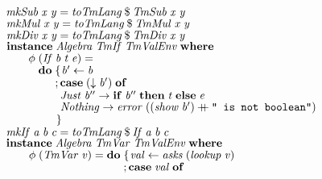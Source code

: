 \documentclass[10pt]{article}
\newcommand{\Conid}[1]{\mathit{#1}}
\newcommand{\Varid}[1]{\mathit{#1}}
\newcommand{\plus}{\mathbin{+\!\!\!+}}
\begin{document}
\begin{tabbing}
${\hskip1.00em\relax\Varid{mkSub}\;\Varid{x}\;\Varid{y}\mathrel{=}\Varid{toTmLang}\mathbin{\$}\Conid{TmSub}\;\Varid{x}\;\Varid{y}}$\\
${\hskip1.00em\relax\Varid{mkMul}\;\Varid{x}\;\Varid{y}\mathrel{=}\Varid{toTmLang}\mathbin{\$}\Conid{TmMul}\;\Varid{x}\;\Varid{y}}$\\
${\hskip1.00em\relax\Varid{mkDiv}\;\Varid{x}\;\Varid{y}\mathrel{=}\Varid{toTmLang}\mathbin{\$}\Conid{TmDiv}\;\Varid{x}\;\Varid{y}}$\\
${}$\\
${\hskip1.00em\relax\mathbf{instance}\;\Conid{Algebra}\;\Conid{TmIf}\;\Conid{TmValEnv}\;\mathbf{where}}$\\
${\hskip1.00em\relax\hskip2.00em\relax\Varid{\phi}\;(\Conid{If}\;\Varid{b}\;\Varid{t}\;\Varid{e})\mathrel{=}}$\\
${\hskip1.00em\relax\hskip2.00em\relax\phantom{\Varid{\phi}\;\mbox{}}\mathbf{do}\;\{\mskip1.5mu \Varid{b'}\leftarrow \Varid{b}}$\\
${\hskip1.00em\relax\hskip2.00em\relax\phantom{\Varid{\phi}\;\mbox{}}\phantom{\mathbf{do}\;\mbox{}};\mathbf{case}\;(\Varid{\downarrow}\;\Varid{b'})\;\mathbf{of}}$\\
${\hskip1.00em\relax\hskip2.00em\relax\phantom{\Varid{\phi}\;\mbox{}}\phantom{\mathbf{do}\;\mbox{}}\phantom{;\mbox{}}\Conid{Just}\;\Varid{b''}\to \mathbf{if}\;\Varid{b''}\;\mathbf{then}\;\Varid{t}\;\mathbf{else}\;\Varid{e}}$\\
${\hskip1.00em\relax\hskip2.00em\relax\phantom{\Varid{\phi}\;\mbox{}}\phantom{\mathbf{do}\;\mbox{}}\phantom{;\mbox{}}\Conid{Nothing}\to \Varid{error}\;((\Varid{show}\;\Varid{b'})\plus \text{\tt \char34 ~is~not~boolean\char34})}$\\
${\hskip1.00em\relax\hskip2.00em\relax\phantom{\Varid{\phi}\;\mbox{}}\phantom{\mathbf{do}\;\mbox{}}\mskip1.5mu\}}$\\
${}$\\
${\hskip1.00em\relax\Varid{mkIf}\;\Varid{a}\;\Varid{b}\;\Varid{c}\mathrel{=}\Varid{toTmLang}\mathbin{\$}\Conid{If}\;\Varid{a}\;\Varid{b}\;\Varid{c}}$\\
${}$\\
${\hskip1.00em\relax\mathbf{instance}\;\Conid{Algebra}\;\Conid{TmVar}\;\Conid{TmValEnv}\;\mathbf{where}}$\\
${\hskip1.00em\relax\hskip2.00em\relax\Varid{\phi}\;(\Conid{TmVar}\;\Varid{v})\mathrel{=}\mathbf{do}\;\{\mskip1.5mu \Varid{val}\leftarrow \Varid{asks}\;(\Varid{lookup}\;\Varid{v})}$\\
${\hskip1.00em\relax\hskip2.00em\relax\phantom{\Varid{\phi}\;(\Conid{TmVar}\;\Varid{v})\mathrel{=}\mathbf{do}\;\mbox{}};\mathbf{case}\;\Varid{val}\;\mathbf{of}}$\\

\end{tabbing}
\end{document}
